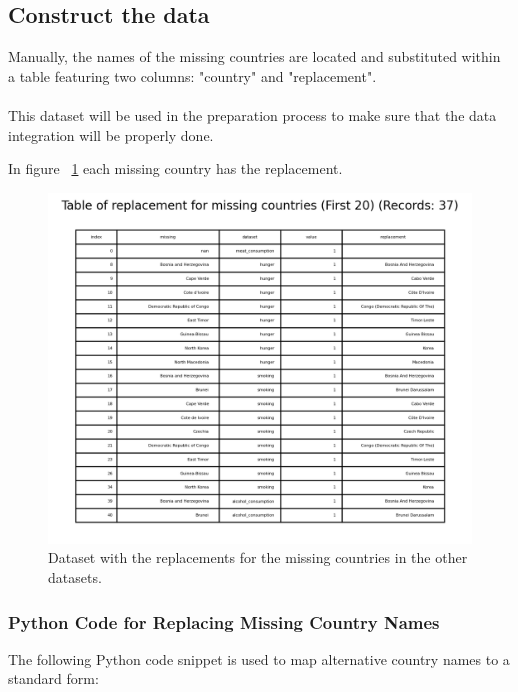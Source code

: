         \subsection{Construct the data}

            Manually, the names of the missing countries are located and substituted within a table featuring two columns: "country" and "replacement".
            \\
            \\
            This dataset will be used in the preparation process to make sure that the data integration will be properly done.

            In figure \figurename~\ref{fig:dp-missing-countries-replacements} each missing country has the replacement.
            \begin{figure}[H]
                \centering
                \includegraphics[scale=1]{images/dp_missing_countries_replacement}
                \caption{Dataset with the replacements for the missing countries in the other datasets.}
                \label{fig:dp-missing-countries-replacements}
            \end{figure}

            \subsubsection{Python Code for Replacing Missing Country Names}

                The following Python code snippet is used to map alternative country names to a standard form:

